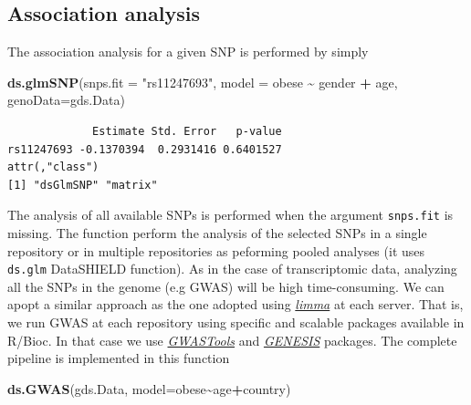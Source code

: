 \documentclass[]{article}
\newenvironment{Shaded}{\begin{snugshade}}{\end{snugshade}}
\newcommand{\DataTypeTok}[1]{\textcolor[rgb]{0.13,0.29,0.53}{#1}}
\newcommand{\KeywordTok}[1]{\textcolor[rgb]{0.13,0.29,0.53}{\textbf{#1}}}
\newcommand{\NormalTok}[1]{#1}
\newcommand{\OperatorTok}[1]{\textcolor[rgb]{0.81,0.36,0.00}{\textbf{#1}}}
\newcommand{\StringTok}[1]{\textcolor[rgb]{0.31,0.60,0.02}{#1}}
\begin{document}
\hypertarget{association-analysis}{%
\subsection{Association analysis}\label{association-analysis}}

The association analysis for a given SNP is performed by simply

\begin{Shaded}
\begin{Highlighting}[]
\KeywordTok{ds.glmSNP}\NormalTok{(}\DataTypeTok{snps.fit =} \StringTok{"rs11247693"}\NormalTok{, }\DataTypeTok{model =}\NormalTok{ obese }\OperatorTok{\textasciitilde{}}\StringTok{ }\NormalTok{gender }\OperatorTok{+}\StringTok{ }\NormalTok{age, }\DataTypeTok{genoData=}\StringTok{\textquotesingle{}gds.Data\textquotesingle{}}\NormalTok{)}
\end{Highlighting}
\end{Shaded}

\begin{verbatim}
             Estimate Std. Error   p-value
rs11247693 -0.1370394  0.2931416 0.6401527
attr(,"class")
[1] "dsGlmSNP" "matrix"  
\end{verbatim}

The analysis of all available SNPs is performed when the argument
\texttt{snps.fit} is missing. The function perform the analysis of the
selected SNPs in a single repository or in multiple repositories as
peforming pooled analyses (it uses \texttt{ds.glm} DataSHIELD function).
As in the case of transcriptomic data, analyzing all the SNPs in the
genome (e.g GWAS) will be high time-consuming. We can apopt a similar
approach as the one adopted using
\emph{\href{https://bioconductor.org/packages/3.9/limma}{limma}} at each
server. That is, we run GWAS at each repository using specific and
scalable packages available in R/Bioc. In that case we use
\emph{\href{https://bioconductor.org/packages/3.9/GWASTools}{GWASTools}}
and \emph{\href{https://bioconductor.org/packages/3.9/GENESIS}{GENESIS}}
packages. The complete pipeline is implemented in this function

\begin{Shaded}
\begin{Highlighting}[]
\KeywordTok{ds.GWAS}\NormalTok{(}\StringTok{\textquotesingle{}gds.Data\textquotesingle{}}\NormalTok{, }\DataTypeTok{model=}\NormalTok{obese}\OperatorTok{\textasciitilde{}}\NormalTok{age}\OperatorTok{+}\NormalTok{country)}
\end{Highlighting}
\end{Shaded}
\end{document}
